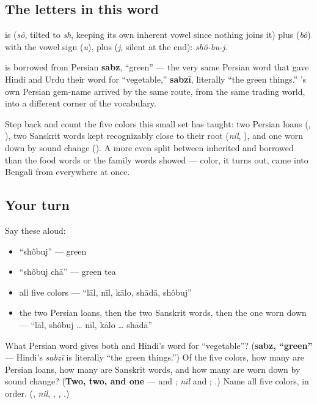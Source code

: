 \subsection*{The letters in this word}
\textbf{} is \textbf{} (\emph{sô}, tilted to \emph{sh}, keeping its own inherent vowel since nothing joins it) plus \textbf{} (\emph{bô}) with the vowel sign \textbf{} (\emph{u}), plus \textbf{} (\emph{j}, silent at the end): \emph{shô-bu-j}.

\begin{cousinweb}
\textbf{} is borrowed from Persian \textbf{sabz}, \textquotedblleft{}green\textquotedblright{} — the very same Persian word that gave Hindi and Urdu their word for \textquotedblleft{}vegetable,\textquotedblright{} \textbf{sabzī}, literally \textquotedblleft{}the green things.\textquotedblright{} 's own Persian gem-name arrived by the same route, from the same trading world, into a different corner of the vocabulary.

Step back and count the five colors this small set has taught: two Persian loans (\textbf{}, \textbf{}), two Sanskrit words kept recognizably close to their root (\emph{nil}, \textbf{}), and one worn down by sound change (\textbf{}). A more even split between inherited and borrowed than the food words or the family words showed — color, it turns out, came into Bengali from everywhere at once.
\end{cousinweb}

\subsection*{Your turn}
Say these aloud:

\begin{itemize}
\raggedright
  \item \textquotedblleft{}shôbuj\textquotedblright{} — green
  \item \textquotedblleft{}shôbuj chā\textquotedblright{} — green tea
  \item all five colors — \textquotedblleft{}lāl, nīl, kālo, shādā, shôbuj\textquotedblright{}
  \item the two Persian loans, then the two Sanskrit words, then the one worn down — \textquotedblleft{}lāl, shôbuj … nīl, kālo … shādā\textquotedblright{}
\end{itemize}

\begin{tcolorbox}[breakable,colback=teal!4,colframe=teal!35!black,title={Before you move on}]
What Persian word gives both  and Hindi's word for \textquotedblleft{}vegetable\textquotedblright{}? (\textbf{sabz, \textquotedblleft{}green\textquotedblright{}} — Hindi's \emph{sabzī} is literally \textquotedblleft{}the green things.\textquotedblright{}) Of the five colors, how many are Persian loans, how many are Sanskrit words, and how many are worn down by sound change? (\textbf{Two, two, and one} —  and ; \emph{nil} and ; .) Name all five colors, in order. (\textbf{}, \emph{nil}, \textbf{}, \textbf{}, \textbf{}.)
\end{tcolorbox}

